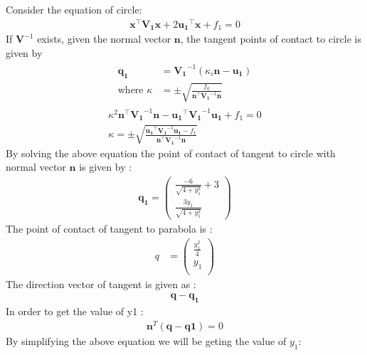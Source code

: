 \documentclass[journal,10pt,twocolumn]{article}
\let\vec\mathbf
\providecommand{\brak}[1]{\ensuremath{\left(#1\right)}}
\begin{document}
Consider the equation of circle:
\begin{align}
\vec{x}^{\top}\vec{V_1}\vec{x}+2\vec{u_1}^{\top}\vec{x}+f_1=0
\end{align}
  If $\vec{V}^{-1}$ exists, given the normal vector $\vec{n}$, the tangent points of contact to circle  is given by
\begin{align}
  \begin{split}
\vec{q_1} &= \vec{V_1}^{-1}\brak{\kappa_i \vec{n}-\vec{u_1}}
\\
\text{where }\kappa &= \pm \sqrt{
\frac{
f_0
}
{
\vec{n}^{\top}\vec{V_1}^{-1}\vec{n}
}
}
  \end{split}
\label{eq:conic_tangent_qk}
\end{align}
\begin{align}
\kappa^2 \vec{n}^{\top}\vec{V_1}^{-1}\vec{n} - \vec{u_1}^{\top}\vec{V_1}^{-1}\vec{u_1} + f_1 =0 \\
\kappa = \pm \sqrt{
\frac{
\vec{u_1}^{\top}\vec{V_1}^{-1}\vec{u_1}-f_1
}
{
\vec{n}^{\top}\vec{V_1}^{-1}\vec{n}
}
}
\end{align}
By solving the above equation the point of contact of tangent to circle with normal vector $\vec{n}$ is given by :
\begin{align}
\vec{q_1} = 
\begin{pmatrix}
\frac{-6}{\sqrt{4+y_1^2}} + 3 \\
\frac{3y_1}{\sqrt{4+y_1^2}} 
\end{pmatrix}
\end{align}
The point of contact of tangent to parabola is :
\begin{align}
q&=
\begin{pmatrix}
\frac{y_1^2}{4} \\
 y_1 \\
\end{pmatrix}
\end{align}
The direction vector of tangent is given as :
\begin{align}
\vec{q}-\vec{q_1}
\end{align}
In order to get the value of y1 :
\begin{align}
\vec{n}^T(\vec{q}-\vec{q1})=0
\end{align}
By simplifying the above equation we will be geting the value of $y_1$:
\end{document}
